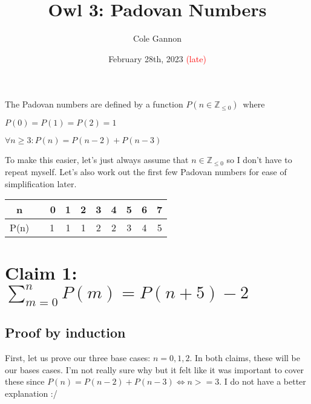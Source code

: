 \documentclass[11pt]{article}
\title{Owl 3: Padovan Numbers}
\author{Cole Gannon}
\date{February 28th, 2023 \textcolor{red}{(late)}}
\def \nonneg {\mathbb{Z}_{\leq 0}}
\def \lf {\newline}
\begin{document}
\maketitle
The Padovan numbers are defined by a function ${P(n \in \nonneg)}$\ where\lf

$P(0)=P(1)=P(2)=1$\lf

$\forall n \geq 3:P(n)=P(n-2)+P(n-3)$\lf

To make this easier, let's just always assume that $n\in\nonneg$ so I don't have to repeat myself.
Let's also work out the first few Padovan numbers for ease of simplification later.  \lf

\begin{tabular}{||c c c c c c c c c||}
   \hline n   &\vline\ \ 0 & 1 & 2 & 3 & 4 & 5 & 6 & 7 \\
   \hline P(n)&\vline\ \ 1 & 1 & 1 & 2 & 2 & 3 & 4 & 5 \\
   \hline
  \end{tabular}

\section*{Claim 1: $\displaystyle\sum_{m=0}^{n} P(m) = P(n+5)-2$}

\subsection*{Proof by induction}

First, let us prove our three base cases: $n=0,1,2$.
In both claims, these will be our bases cases. I'm not really sure why but it felt like it was important to cover these since $P(n)=P(n-2)+P(n-3) \iff n>=3$. I do not have a better explanation :/
\end{document}
